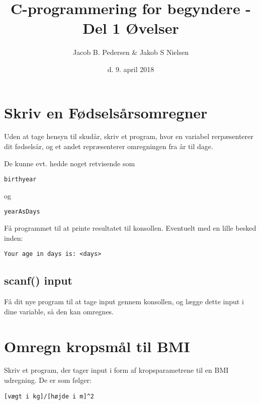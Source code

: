 \documentclass[hidelinks]{article} %
\title{C-programmering for begyndere - Del 1
 		\break
 		\break
		\large Øvelser} %
\date{d. 9. april 2018} %
\author{Jacob B. Pedersen \break \& \break Jakob S Nielsen} %
\begin{document}

	\section{Skriv en Fødselsårsomregner}
Uden at tage hensyn til skudår, skriv et program, hvor en variabel rerpæsenterer dit fødselsår, og et andet repræsenterer omregningen fra år til dage.

De kunne evt. hedde noget retvisende som 
\begin{verbatim}birthyear
\end{verbatim}
og
\begin{verbatim}yearAsDays
\end{verbatim}

Få programmet til at printe resultatet til konsollen. Eventuelt med en lille besked inden:

\begin{verbatim}Your age in days is: <days>
\end{verbatim}

	\subsection{scanf() input}
Få dit nye program til at tage input gennem konsollen, og lægge dette input i dine variable, så den kan omregnes.

	\section{Omregn kropsmål til BMI}
Skriv et program, der tager input i form af kropsparametrene til en BMI udregning. De er som følger:
\begin{verbatim}[vægt i kg]/[højde i m]^2
\end{verbatim}
\end{document}
